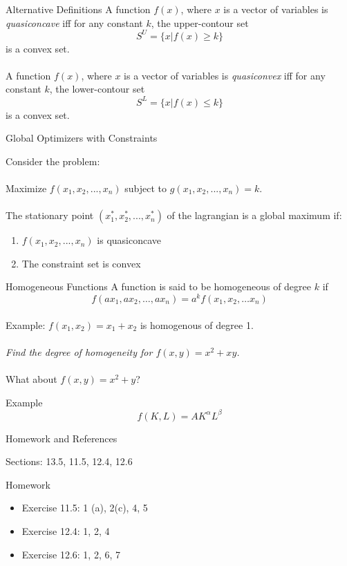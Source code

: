 \documentclass{./../../Latex/teaching_slides}
\begin{document}
\begin{frame}{Alternative Definitions}
A function $f(x)$, where $x$ is a vector of variables is \textit{quasiconcave} iff for any constant $k$, the upper-contour set
$$ S^U = \{x | f(x) \geq k \} $$
is a convex set. \\~\\
A function $f(x)$, where $x$ is a vector of variables is \textit{quasiconvex} iff for any constant $k$, the lower-contour set
$$ S^L = \{x | f(x) \leq k \} $$
is a convex set.
\end{frame}


\begin{frame}{Global Optimizers with Constraints}

Consider the problem:\\~\\
Maximize $f(x_1,x_2,...,x_n)$ subject to $g(x_1, x_2,...,x_n)=k$.\\~\\

The stationary point $(x_1^*, x_2^*, ..., x_n^*)$ of the lagrangian is a global maximum if:
\begin{enumerate}
  \item $f(x_1,x_2,...,x_n)$ is quasiconcave
  \item The constraint set is convex
\end{enumerate}
\end{frame}

\begin{frame}{Homogeneous Functions}
A function is said to be homogeneous of degree $k$ if 
$$ f(a x_1, ax_2, \hdots, a x_n) = a^k f(x_1, x_2, \hdots x_n) $$ \\
\vspace{1em}
Example: $f(x_1,x_2) = x_1 + x_2$ is homogenous of degree 1. \\~\\
\textit{Find the degree of homogeneity for $f(x,y) = x^2 + xy$.} \\~\\
What about $f(x,y) = x^2 + y$?
\end{frame}

\begin{frame}{Example}
$$ f(K,L) = A K^{\alpha}L^{\beta} $$
\end{frame}

\begin{frame}{Homework and References}
\begin{witemize}
  \item Sections: 13.5, 11.5, 12.4, 12.6
  \item Homework
  \begin{itemize}
  \normalsize
  \item Exercise 11.5: 1 (a), 2(c), 4, 5
  \item Exercise 12.4: 1, 2, 4
  \item Exercise 12.6: 1, 2, 6, 7
\end{itemize}
\end{witemize}
\end{frame}
\end{document}
